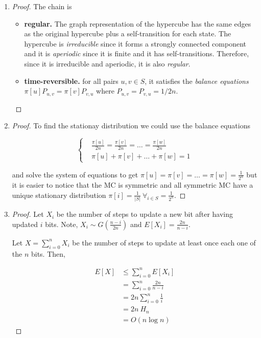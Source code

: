 \documentclass[12pt, a4paper]{article} %
\begin{document}
\begin{enumerate}[label=(\alph*)]
  \item\label{item:5a} \begin{proof} The chain is

      \begin{itemize}
        \item \textbf{regular.} The graph representation of the hypercube has the same edges as the original hypercube plus a self-transition for each state. The hypercube is \textit{irreducible} since it forms a strongly connected component and it is \textit{aperiodic} since it is finite and it has self-transitions. Therefore, since it is irreducible and aperiodic, it is also \textit{regular}.

        \item \textbf{time-reversible.} for all pairs $u, v \in S$, it satisfies the \textit{balance equations} $\pi[u]P_{u,v} = \pi[v]P_{v,u}$ where $P_{u,v} = P_{v,u} = 1/2n$.
      \end{itemize}

  \end{proof}

\item\label{item:5b} \begin{proof} To find the stationay distribution we could use the balance equations

  \begin{equation*}
    \begin{cases}
      &\frac{\pi[u]}{2n} = \frac{\pi[v]}{2n} = \ldots = \frac{\pi[w]}{2n}\\
      &\pi[u] + \pi[v] + \ldots + \pi[w] = 1
    \end{cases}
  \end{equation*}

  and solve the system of equations to get $\pi[u] = \pi[v] = \ldots = \pi[w] = \frac{1}{2^n}$ but it is easier to notice that the MC is symmetric and all symmetric MC have a unique stationary distribution $\pi[i] = \frac{1}{|S|} \ \forall_{i \in S} = \frac{1}{2^n}$.

  \end{proof}

\item\label{item:5c} \begin{proof} Let $X_i$ be the number of steps to update a new bit after having updated $i$ bits. Note, $X_i \sim G(\frac{n-i}{2n})$ and $E[X_i] = \frac{2n}{n - i}$.

    Let $X = \sum_{i = 0}^{n} X_i$ be the number of steps to update at least once each one of the $n$ bits. Then,

    \begin{align*}
      E[X] &\leq \sum_{i = 0}^{n} E[X_i] \\
           &= \sum_{i = 0}^{n} \frac{2n}{n-i} \\
           &= 2n \sum_{i = 0}^{n} \frac{1}{i} \\
           &= 2n \ H_n \\
           &= O(n \log n)
    \end{align*}
  \end{proof}
\end{enumerate}

\end{document}
